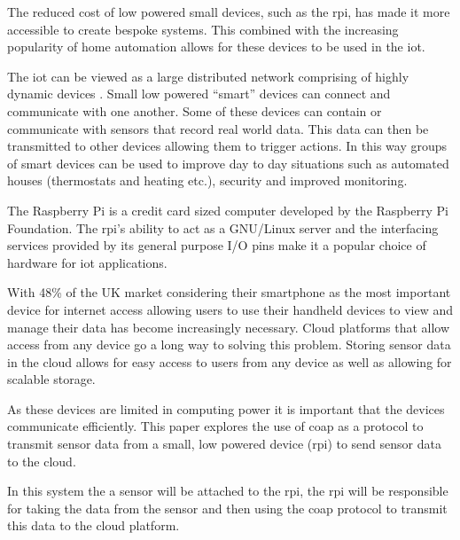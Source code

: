 The reduced cost of low powered small devices, such as the \gls{rpi}, has made it more accessible to create bespoke systems. 
This combined with the increasing popularity of home automation allows for these devices to be used in the \gls{iot}.

The \gls{iot} can be viewed as a large distributed network comprising of highly dynamic devices \citep{miorandi2012internet}. Small low powered ``smart'' devices can connect and communicate with one another. Some of these devices can contain or communicate with sensors that record real world data. This data can then be transmitted to other devices allowing them to trigger actions. In this way groups of smart devices can be used to improve day to day situations such as automated houses (thermostats and heating etc.), security and improved monitoring.

The Raspberry Pi \citep{pi3model} is a credit card sized computer developed by the Raspberry Pi Foundation. 
The \gls{rpi}'s ability to act as a GNU/Linux server and the interfacing services provided by its general purpose I/O pins make it a popular 
choice of hardware for \gls{iot} applications. \citep{kumar2016iot}

With 48\% of the UK market considering their smartphone as the most important device for internet access \citep{ofcom2018} allowing users to use their handheld devices to view and manage their data has become increasingly necessary. Cloud platforms that allow access from any device go a long way to 
solving this problem. Storing sensor data in the cloud allows for easy access to users from any device as well as allowing for scalable storage.

As these devices are limited in computing power it is important that the devices communicate efficiently. 
This paper explores the use of \gls{coap} as a protocol to transmit sensor data from a small, low powered device (\gls{rpi}) to send sensor data to the cloud.

In this system the a sensor will be attached to the \gls{rpi}, the \gls{rpi} will be responsible for taking the data from the sensor and then 
using the \gls{coap} protocol to transmit this data to the cloud platform.